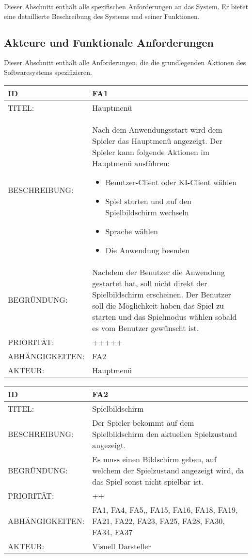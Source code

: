 \documentclass{uulm-assignment}
\begin{document}
    Dieser Abschnitt enthält alle spezifischen Anforderungen an das System. Er bietet eine detaillierte Beschreibung des Systems und seiner Funktionen.

    \subsection{Akteure und Funktionale Anforderungen}

    Dieser Abschnitt enthält alle Anforderungen, die die grundlegenden Aktionen des Softwaresystems spezifizieren.

    \begin{tabularx}{\textwidth}{|l|X |} \hline
        \textbf{ID} & \textbf{FA1} \\
        \hline
        TITEL: & Hauptmenü \\
        \hline
        BESCHREIBUNG: & Nach dem Anwendungsstart wird dem Spieler das Hauptmenü angezeigt. Der Spieler kann folgende Aktionen im Hauptmenü ausführen:
        \begin{itemize}
            \item Benutzer-Client oder KI-Client wählen
            \item Spiel starten und auf den Spielbildschirm wechseln
            \item Sprache wählen 
            \item Die Anwendung beenden
        \end{itemize}
        \\
        \hline
        BEGRÜNDUNG: & Nachdem der Benutzer die Anwendung gestartet hat, soll nicht direkt der Spielbildschirm erscheinen.
        Der Benutzer soll die Möglichkeit haben das Spiel zu starten und das Spielmodus wählen sobald es vom Benutzer gewünscht ist.\\
        \hline
        PRIORITÄT: & +++++ \\
        \hline
        ABHÄNGIGKEITEN: & FA2\\
         \hline
         AKTEUR: & Hauptmenü 
         \\
        \hline        
    \end{tabularx}

    \begin{tabularx}{\textwidth}{|l|X |} \hline
        \textbf{ID} & \textbf{FA2} \\
        \hline
        TITEL: & Spielbildschirm \\
        \hline
        BESCHREIBUNG: & Der Spieler bekommt auf dem Spielbildschirm den aktuellen Spielzustand angezeigt.
        \\
        \hline
        BEGRÜNDUNG: & Es muss einen Bildschirm geben, auf welchem der Spielzustand angezeigt wird, da das Spiel
        sonst nicht spielbar ist. \\
        \hline
        PRIORITÄT: & ++ \\
        \hline
        ABHÄNGIGKEITEN: & FA1, FA4, FA5,, FA15, FA16, FA18, FA19, FA21, FA22, FA23, FA25, FA28, FA30, FA34, FA37\\
        \hline 
        AKTEUR: & Visuell Darsteller
        \\
        \hline
    \end{tabularx}
\end{document}
